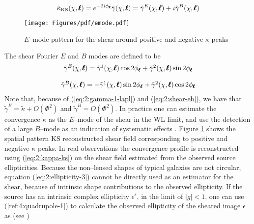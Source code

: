 \begin{equation}
\label{eq:2:kappa-ks}
\tilde{\kappa}_{\rm KS}(\chi,\pmb{\ell}) = e^{-2i\phi_{\pmb{\ell}}} \tilde{\gamma}(\chi,\pmb{\ell}) = \tilde{\gamma}^E(\chi,\pmb{\ell}) + i\tilde{\gamma}^B(\chi,\pmb{\ell})
\end{equation}
%
\begin{figure}
\begin{center}
\texttt{[image: Figures/pdf/emode.pdf]}
\end{center}
\caption{$E$--mode pattern for the shear around positive and negative $\kappa$ peaks}
\label{fig:2:emode}
\end{figure}
%
The shear Fourier $E$ and $B$ modes are defined to be 
\begin{equation}
\label{eq:2:shear-eb}
\begin{matrix}
\tilde{\gamma}^E(\chi,\pmb{\ell}) =  \tilde{\gamma}^1(\chi,\pmb{\ell})\cos 2\phi_{\pmb{\ell}} +  \tilde{\gamma}^2(\chi,\pmb{\ell}) \sin 2\phi_{\pmb{\ell}}\\ \\ 
\tilde{\gamma}^B(\chi,\pmb{\ell}) = - \tilde{\gamma}^1(\chi,\pmb{\ell})\sin 2\phi_{\pmb{\ell}} + \tilde{\gamma}^2(\chi,\pmb{\ell}) \cos 2\phi_{\pmb{\ell}}
\end{matrix}
\end{equation}
%
Note that, because of (\ref{eq:2:gamma-1-lapl}) and (\ref{eq:2:shear-eb}), we have that $\tilde{\gamma}^E=\tilde{\kappa}+O(\Phi^2)$ and $\tilde{\gamma}^B=O(\Phi^2)$. In practice one can estimate the convergence $\kappa$ as the $E$--mode of the shear in the WL limit, and use the detection of a large $B$--mode as an indication of systematic effects \citep{PetriSpShear}. Figure \ref{fig:2:emode} shows the spatial pattern KS reconstructed shear field corresponding to positive and negative $\kappa$ peaks. In real observations the convergence profile is reconstructed using (\ref{eq:2:kappa-ks}) on the shear field estimated from the observed source ellipticities. Because the non--lensed shapes of typical galaxies are not circular, equation (\ref{eq:2:ellipticity-3}) cannot be directly used as an estimator for the shear, because of intrinsic shape contributions to the observed ellipticity. If the source has an intrinsic complex ellipticity $\epsilon^s$, in the limit of $\vert g\vert<1$, one can use (\ref{ref:4:quadrupole-1}) to calculate the observed ellipticity of the sheared image $\epsilon$ as (see \citep{RayTracingHartlap})

